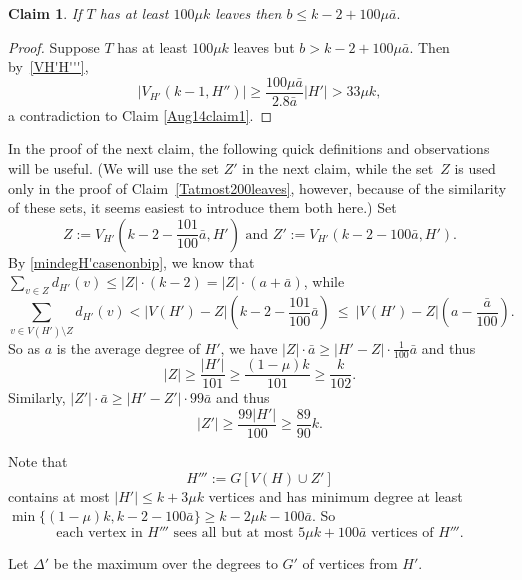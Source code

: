 \documentclass[12pt]{article}
\newtheorem{claim}[theorem]{Claim}
\begin{document}
  
  
                 \begin{claim}\label{avdegH'toH'cupX}
If $T$ has at least $100\mu k$ leaves then  $b\le k-2+100\mu \bar a.$
          \end{claim}
          
        \begin{proof}
        Suppose $T$ has at least $100\mu k$ leaves but  $b> k-2+100\mu \bar a.$ 
       Then by~\eqref{VH'H'''}, $$|V_{H'}(k-1, H'')|\ge \frac{100\mu \bar a}{2.8\bar a}|H'|> 33\mu k,$$
       a contradiction to Claim \ref{Aug14claim1}.
    \end{proof}
    
       
   In the proof of the next claim, the following quick definitions and observations will be useful. (We will use the set $Z'$ in the next claim, while the set~$Z$ is used only in the proof of Claim~\ref{Tatmost200leaves}, however, because of the similarity of these sets, it seems easiest to introduce them both here.)
 Set $$Z:=V_{H'}(k-2-\frac{101}{100}\bar a, H')
\text{ \ \ and \ \ }
Z':=V_{H'}(k-2-100\bar a, H').
 $$
By \eqref{mindegH'casenonbip}, we know that $\sum_{v\in Z}d_{H'}(v)\le |Z| \cdot (k-2)= |Z| \cdot (a+\bar a)$, while $$\sum_{v\in V(H')\setminus Z}d_{H'}(v)< |V(H')-Z|(k-2-\frac{101}{100}\bar a) \ \le \ |V(H')-Z| (a-\frac{\bar a}{100}).$$
So as $a$ is the average degree of $H'$, we have $ |Z| \cdot \bar a\ge |H'-Z|\cdot \frac{1}{100}\bar a $ and thus 
    \begin{equation}\label{ZZZZ}
    |Z| \ge \frac{|H'|}{101} \ge \frac{(1-\mu) k}{101} \ge \frac{k}{102}.
   \end{equation}
  Similarly, $ |Z'|\cdot \bar a \ge  |H'-Z'|\cdot 99\bar a$ and thus
    \begin{equation}\label{ZZZZ'}
    |Z'| \ge  \frac{99|H'| }{100}\ge   \frac{89}{90}k.
   \end{equation}
   
   
 Note that  $$H''':=G[V(H) \cup Z']$$ 
 contains at most $|H'|\le k+3 \mu k$
vertices and has minimum degree at least $\min\{(1-\mu)k, k-2-100\bar a\}\ge k-2\mu k-100\bar a$.
So
    \begin{equation}\label{ZZZZadj}
 \text{each vertex  in  $H'''$ sees all but at most $5\mu k +100\bar a$  vertices of $H'''$.}
          \end{equation}
                
                Let $\Delta'$ be the maximum over the degrees to $G'$ of vertices from $H'$.
            
\end{document}
